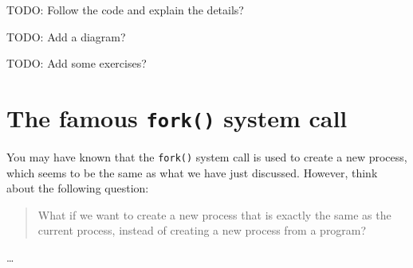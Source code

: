 TODO: Follow the code and explain the details?

TODO: Add a diagram?

TODO: Add some exercises?

\section{The famous \texttt{fork()} system call}

You may have known that the \texttt{fork()} system call is used to create a new process, which seems
to be the same as what we have just discussed. However, think about the following question:

\begin{quote}
    What if we want to create a new process that is exactly the same as the current process, instead
    of creating a new process from a program?
\end{quote}

\dots
